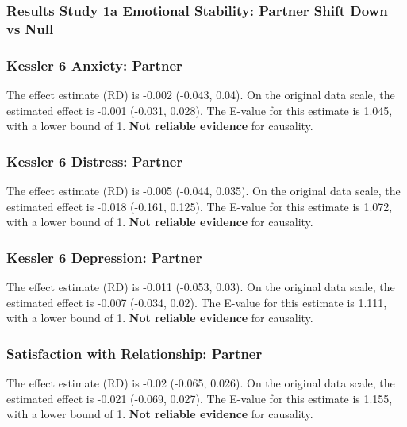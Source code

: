 \documentclass[
  singlecolumn]{article}
\begin{document}
\newpage{}

\subsubsection{Results Study 1a Emotional Stability: Partner Shift Down
vs
Null}\label{results-study-1a-emotional-stability-partner-shift-down-vs-null}

\subsubsection{Kessler 6 Anxiety:
Partner}\label{kessler-6-anxiety-partner-4}

The effect estimate (RD) is -0.002 (-0.043, 0.04). On the original data
scale, the estimated effect is -0.001 (-0.031, 0.028). The E-value for
this estimate is 1.045, with a lower bound of 1. \textbf{Not reliable
evidence} for causality.

\subsubsection{Kessler 6 Distress:
Partner}\label{kessler-6-distress-partner-4}

The effect estimate (RD) is -0.005 (-0.044, 0.035). On the original data
scale, the estimated effect is -0.018 (-0.161, 0.125). The E-value for
this estimate is 1.072, with a lower bound of 1. \textbf{Not reliable
evidence} for causality.

\subsubsection{Kessler 6 Depression:
Partner}\label{kessler-6-depression-partner-4}

The effect estimate (RD) is -0.011 (-0.053, 0.03). On the original data
scale, the estimated effect is -0.007 (-0.034, 0.02). The E-value for
this estimate is 1.111, with a lower bound of 1. \textbf{Not reliable
evidence} for causality.

\subsubsection{Satisfaction with Relationship:
Partner}\label{satisfaction-with-relationship-partner-4}

The effect estimate (RD) is -0.02 (-0.065, 0.026). On the original data
scale, the estimated effect is -0.021 (-0.069, 0.027). The E-value for
this estimate is 1.155, with a lower bound of 1. \textbf{Not reliable
evidence} for causality.
\end{document}
